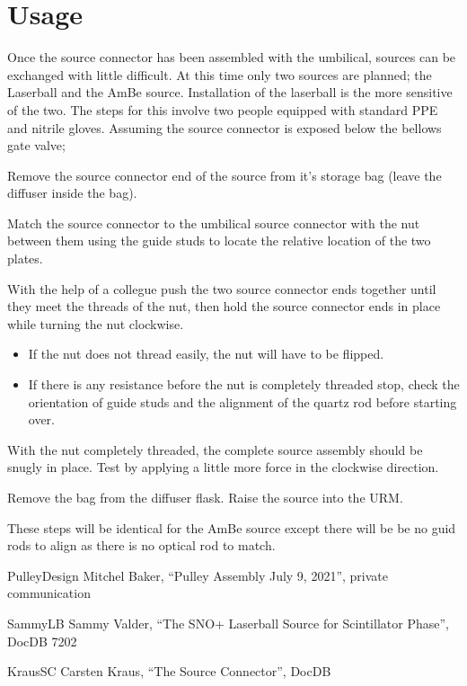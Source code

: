 \documentclass[12pt]{article}
\begin{document}
\section{Usage}
Once the source connector has been assembled with the umbilical,
sources can be exchanged with little difficult. At this time only two
sources are planned; the Laserball and the AmBe source. Installation
of the laserball is the more sensitive of the two. The steps for this
involve two people equipped with standard PPE and nitrile
gloves. Assuming the source connector is exposed below the bellows
gate valve;
\begin{answerlist}
\item Remove the source connector end of the source from it's storage bag (leave the diffuser inside the bag).
\item Match the source connector to the umbilical source connector with the nut between them using the guide studs to locate the relative location of the two plates.
\item With the help of a collegue push the two source connector ends together until they meet the threads of the nut, then hold the source connector ends in place while turning the nut clockwise.
  \begin{itemize}
  \item If the nut does not thread easily, the nut will have to be flipped.
  \item If there is any resistance before the nut is completely threaded stop, check the orientation of guide studs and the alignment of the quartz rod before starting over.
  \end{itemize}
\item With the nut completely threaded, the complete source assembly should be snugly in place. Test by applying a little more force in the clockwise direction.
\item Remove the bag from the diffuser flask. Raise the source into the URM.
\end{answerlist}
These steps will be identical for the AmBe source except there will be be no guid rods to align as there is no optical rod to match.

\begin{thebibliography}{99}
\item[PulleyDesign] Mitchel Baker, ``Pulley Assembly July 9, 2021'', private communication
\item[SammyLB] Sammy Valder, ``The SNO+ Laserball Source for Scintillator Phase'', DocDB 7202
\item[KrausSC] Carsten Kraus, ``The Source Connector'', DocDB 
  
\end{thebibliography}
\end{document}
